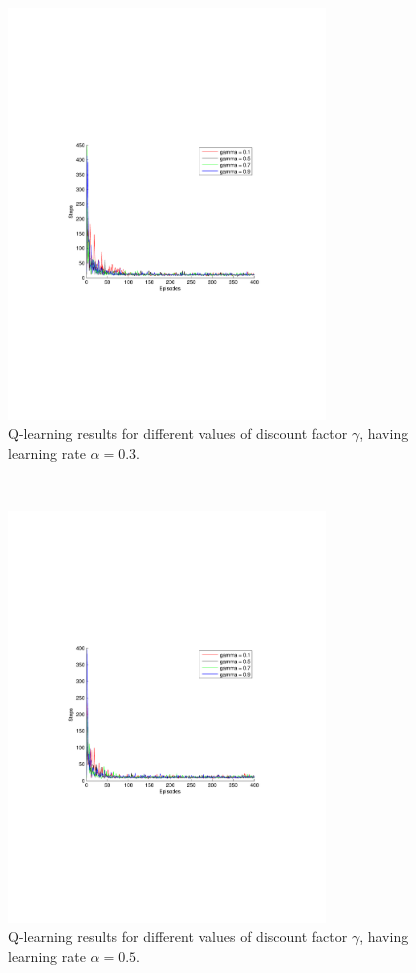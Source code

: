 \documentclass[a4paper,11pt]{article}
\begin{document}
\begin{figure}[h!]
  \centering
    \includegraphics[trim=4cm 8.5cm 4cm 8.5cm,clip,width=0.75\textwidth]{figures/qla03.pdf}
    \caption{Q-learning results for different values of discount factor $\gamma$, having learning rate $\alpha = 0.3$.}
    \label{q03}
\end{figure}
~
\begin{figure}[h!]
  \centering
    \includegraphics[trim=4cm 8.5cm 4cm 8.5cm,clip,width=0.75\textwidth]{figures/qla05.pdf}
    \caption{Q-learning results for different values of discount factor $\gamma$, having learning rate $\alpha = 0.5$.}
    \label{q05}
\end{figure}
\end{document}
